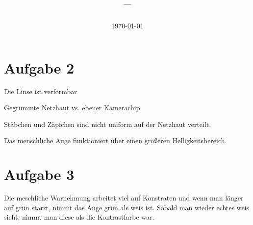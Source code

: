 \documentclass[11pt,a4paper]{article}
\title{\Veranstaltung{} -- \Nummer{} \Uebung{} }
\author{\Tutanden}
\date{\today}
\begin{document}
\maketitle
\thispagestyle{fancy}

\section{Aufgabe 2}
\begin{enumeration}
\item Die Linse ist verformbar
\item Gegrümmte Netzhaut vs. ebener Kamerachip
\item Stäbchen und Zäpfchen sind nicht uniform auf der Netzhaut verteilt.
\item Das menschliche Auge funktioniert über einen größeren Helligkeitsbereich.
\end{enumeration}

\section{Aufgabe 3}
Die meschliche Warnehmung arbeitet viel auf Konstraten und wenn man länger
auf grün starrt, nimmt das Auge grün als weis ist. Sobald man wieder echtes weis sieht, 
nimmt man diese als die Kontrastfarbe war.
\end{document}

